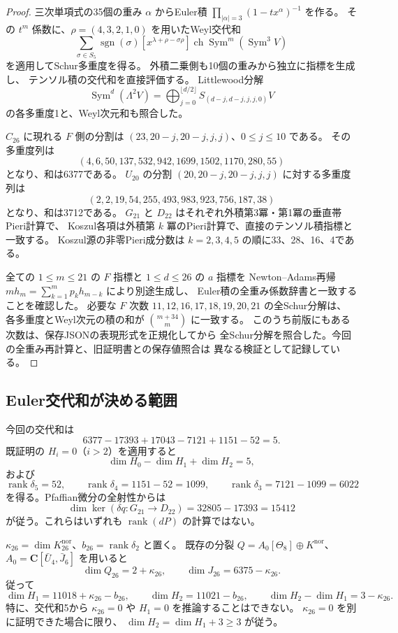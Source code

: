 \begin{proof}
三次単項式の35個の重み $\alpha$ からEuler積
$\prod_{|\alpha|=3}(1-tx^\alpha)^{-1}$ を作る。
その $t^m$ 係数に、$\rho=(4,3,2,1,0)$ を用いたWeyl交代和
\[
 \sum_{\sigma\in S_5}\operatorname{sgn}(\sigma)
 [x^{\lambda+\rho-\sigma\rho}]
 \operatorname{ch}\operatorname{Sym}^m(\operatorname{Sym}^3V)
\]
を適用してSchur多重度を得る。
外積二乗側も10個の重みから独立に指標を生成し、
テンソル積の交代和を直接評価する。
Littlewood分解
\[
 \operatorname{Sym}^d(\Lambda^2V)
 =\bigoplus_{j=0}^{\lfloor d/2\rfloor}S_{(d-j,d-j,j,j,0)}V
\]
の各多重度1と、Weyl次元和も照合した。

$C_{26}$ に現れる $F$ 側の分割は
$(23,20-j,20-j,j,j)$、$0\leq j\leq10$ である。
その多重度列は
\[
 (4,6,50,137,532,942,1699,1502,1170,280,55)
\]
となり、和は6377である。
$U_{20}$ の分割 $(20,20-j,20-j,j,j)$ に対する多重度列は
\[
 (2,2,19,54,255,493,983,923,756,187,38)
\]
となり、和は3712である。
$G_{21}$ と $D_{22}$ はそれぞれ外積第3冪・第1冪の垂直帯Pieri計算で、
Koszul各項は外積第 $k$ 冪のPieri計算で、直接のテンソル積指標と一致する。
Koszul源の非零Pieri成分数は $k=2,3,4,5$ の順に33、28、16、4である。

全ての $1\leq m\leq21$ の $F$ 指標と $1\leq d\leq26$ の $a$ 指標を
Newton--Adams再帰 $m h_m=\sum_{k=1}^m p_kh_{m-k}$ により別途生成し、
Euler積の全重み係数辞書と一致することを確認した。
必要な $F$ 次数 $11,12,16,17,18,19,20,21$ の全Schur分解は、
各多重度とWeyl次元の積の和が $\binom{m+34}{m}$ に一致する。
このうち前版にもある次数は、保存JSONの表現形式を正規化してから
全Schur分解を照合した。今回の全重み再計算と、旧証明書との保存値照合は
異なる検証として記録している。
\end{proof}

\subsection{Euler交代和が決める範囲}

今回の交代和は
\[
 6377-17393+17043-7121+1151-52=5.
\]
既証明の $H_i=0$（$i>2$）を適用すると
\[
 \dim H_0-\dim H_1+\dim H_2=5,
\]
および
\[
 \operatorname{rank}\delta_5=52,\qquad
 \operatorname{rank}\delta_4=1151-52=1099,\qquad
 \operatorname{rank}\delta_3=7121-1099=6022
\]
を得る。Pfaffian微分の全射性からは
\[
 \dim\ker(\delta q:G_{21}\to D_{22})=32805-17393=15412
\]
が従う。これらはいずれも $\operatorname{rank}(dP)$ の計算ではない。

$\kappa_{26}=\dim K^{\mathrm{nor}}_{26}$、$b_{26}=\operatorname{rank}\delta_2$ と置く。
既存の分裂
$Q=A_0[\Theta_8]\oplus K^{\mathrm{nor}}$、
$A_0=\mathbf C[\bar U_4,\bar J_6]$ を用いると
\[
 \dim Q_{26}=2+\kappa_{26},\qquad
 \dim J_{26}=6375-\kappa_{26}.
\]
従って
\[
 \dim H_1=11018+\kappa_{26}-b_{26},\qquad
 \dim H_2=11021-b_{26},\qquad
 \dim H_2-\dim H_1=3-\kappa_{26}.
\]
特に、交代和5から $\kappa_{26}=0$ や $H_1=0$ を推論することはできない。
$\kappa_{26}=0$ を別に証明できた場合に限り、
$\dim H_2=\dim H_1+3\geq3$ が従う。

